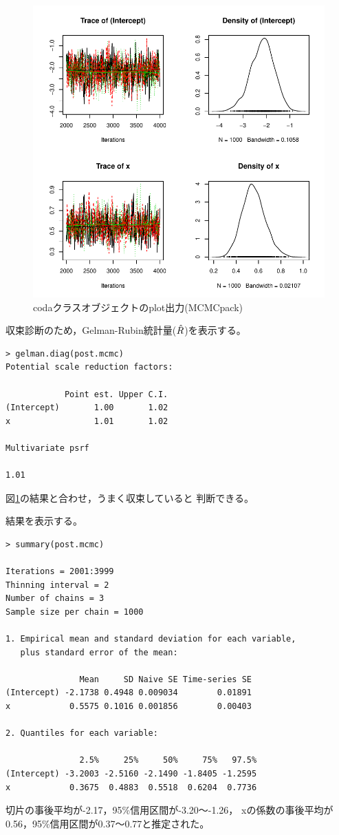 \documentclass[11pt,uplatex]{jsarticle}
\begin{document}
\begin{figure}[htbp]
	\begin{center}
		\includegraphics[bb=0 0 400 400, clip, width=300 bp]{example2_results.pdf}
	\end{center}
	\caption{\textsf{coda}クラスオブジェクトのplot出力(MCMCpack)}
	\label{plot_coda_mcmcpack}
\end{figure}

収束診断のため，Gelman-Rubin統計量($\Hat{R}$)を表示する。
\begin{lstlisting}
> gelman.diag(post.mcmc)
Potential scale reduction factors:

            Point est. Upper C.I.
(Intercept)       1.00       1.02
x                 1.01       1.02

Multivariate psrf

1.01
\end{lstlisting}
図\ref{plot_coda_mcmcpack}の結果と合わせ，うまく収束していると
判断できる。



結果を表示する。
\begin{lstlisting}
> summary(post.mcmc)

Iterations = 2001:3999
Thinning interval = 2 
Number of chains = 3 
Sample size per chain = 1000 

1. Empirical mean and standard deviation for each variable,
   plus standard error of the mean:

               Mean     SD Naive SE Time-series SE
(Intercept) -2.1738 0.4948 0.009034        0.01891
x            0.5575 0.1016 0.001856        0.00403

2. Quantiles for each variable:

               2.5%     25%     50%     75%   97.5%
(Intercept) -3.2003 -2.5160 -2.1490 -1.8405 -1.2595
x            0.3675  0.4883  0.5518  0.6204  0.7736

\end{lstlisting}
切片の事後平均が-2.17，95\%信用区間が-3.20〜-1.26，
xの係数の事後平均が0.56，95\%信用区間が0.37〜0.77と推定された。
\end{document}
